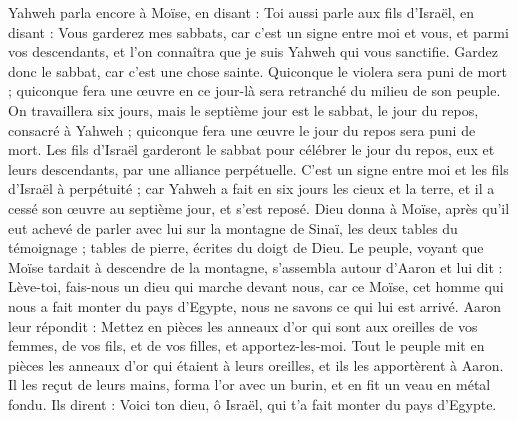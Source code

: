 \begin{multicols}{2}
Yahweh parla encore à Moïse, en disant :
Toi aussi parle aux fils d'Israël, en disant : Vous garderez mes sabbats, car c'est un signe entre moi et vous, et parmi vos descendants, et l’on connaîtra que je suis Yahweh qui vous sanctifie.
Gardez donc le sabbat, car c’est une chose sainte. Quiconque le violera sera puni de mort ; quiconque fera une œuvre en ce jour-là sera retranché du milieu de son peuple.
On travaillera six jours, mais le septième jour est le sabbat, le jour du repos, consacré à Yahweh ; quiconque fera une œuvre le jour du repos sera puni de mort.
Les fils d'Israël garderont le sabbat pour célébrer le jour du repos, eux et leurs descendants, par une alliance perpétuelle.
C'est un signe entre moi et les fils d'Israël à perpétuité ; car Yahweh a fait en six jours les cieux et la terre, et il a cessé son œuvre au septième jour, et s'est reposé.
Dieu donna à Moïse, après qu'il eut achevé de parler avec lui sur la montagne de Sinaï, les deux tables du témoignage ; tables de pierre, écrites du doigt de Dieu.
\VerseOne{}Le peuple, voyant que Moïse tardait à descendre de la montagne, s'assembla autour d’Aaron et lui dit : Lève-toi, fais-nous un dieu qui marche devant nous, car ce Moïse, cet homme qui nous a fait monter du pays d'Egypte, nous ne savons ce qui lui est arrivé.
Aaron leur répondit : Mettez en pièces les anneaux d'or qui sont aux oreilles de vos femmes, de vos fils, et de vos filles, et apportez-les-moi.
Tout le peuple mit en pièces les anneaux d'or qui étaient à leurs oreilles, et ils les apportèrent à Aaron.
Il les reçut de leurs mains, forma l'or avec un burin, et en fit un veau en métal fondu. Ils dirent : Voici ton dieu, ô Israël, qui t'a fait monter du pays d'Egypte.

\end{multicols}
